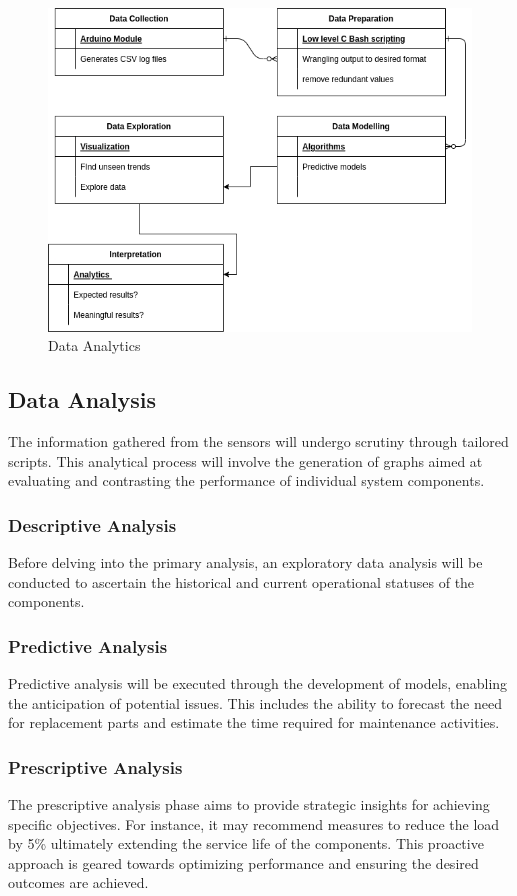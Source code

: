 \begin{figure}[hb]
	\centering
	\includegraphics[width=0.7\linewidth]{Figures/data_analytics_process-steps}
	\caption{Data Analytics}
	\label{fig:dataanalyticsprocess-steps}
\end{figure}


\subsection{ Data Analysis}
The information gathered from the sensors will undergo scrutiny through tailored scripts. This analytical process will involve the generation of graphs aimed at evaluating and contrasting the performance of individual system components.

\subsubsection{Descriptive Analysis}
Before delving into the primary analysis, an exploratory data analysis will be conducted to ascertain the historical and current operational statuses of the components.

\subsubsection{Predictive Analysis}
Predictive analysis will be executed through the development of models, enabling the anticipation of potential issues. This includes the ability to forecast the need for replacement parts and estimate the time required for maintenance activities.

\subsubsection{Prescriptive Analysis}
The prescriptive analysis phase aims to provide strategic insights for achieving specific objectives. For instance, it may recommend measures to reduce the load by 5\% ultimately extending the service life of the components. This proactive approach is geared towards optimizing performance and ensuring the desired outcomes are achieved.
\newpage


